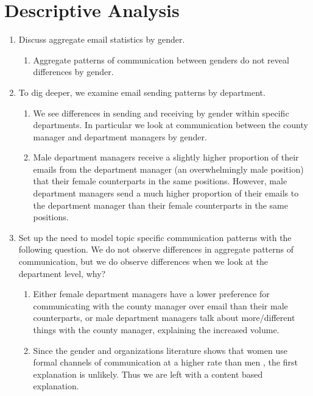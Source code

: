 \documentclass[fleqn]{MJDArticle}
\begin{document}
\section{Descriptive Analysis}
\begin{enumerate}
	\item Discuss aggregate email statistics by gender.
	\begin{enumerate}
		\item Aggregate patterns of communication between genders do not reveal differences by gender. 
	\end{enumerate}
	\item To dig deeper, we examine email sending patterns by department.
	\begin{enumerate}
		\item We see differences in sending and receiving by gender within specific departments. In particular we look at communication between the county manager and department managers by gender.
		\item Male department managers receive a slightly higher proportion  of their emails from the department manager (an overwhelmingly male position) that their female counterparts in the same positions. However, male department managers send a much higher proportion of their emails to the department manager than their female counterparts in the same positions. 
	\end{enumerate}
	\item Set up the need to model topic specific communication patterns with the following question. We do not observe differences in aggregate patterns of communication, but we do observe differences when we look at the department level, why?
	\begin{enumerate}
		\item Either female department managers have a lower preference for communicating with the county manager over email than their male counterparts, or male department managers talk about more/different things with the county manager, explaining the increased volume. 
		\item Since the gender and organizations literature shows that women use formal channels of communication at a higher rate than men \citep{Ragins1989}, the first explanation is unlikely. Thus we are left with a content based explanation.
	\end{enumerate}
\end{enumerate}
\end{document}
